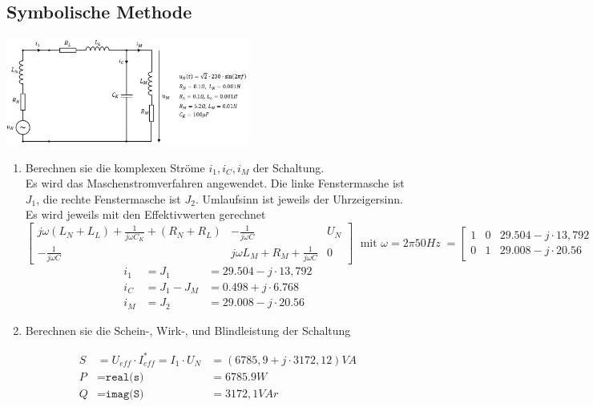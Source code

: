 \newpage
\subsection{Symbolische Methode}
\includegraphics[width=0.6\textwidth]{bilder/a41.png}
\begin{enumerate}
\item Berechnen sie die komplexen Ströme $i_1 , i_C, i_M$ der Schaltung.\\
Es wird das Maschenstromverfahren angewendet. Die linke Fenstermasche ist $J_1$, die rechte Fenstermasche ist $J_2$. Umlaufsinn ist jeweils der Uhrzeigersinn. Es wird jeweils mit den Effektivwerten gerechnet
\[
	\left[
	\begin{array}{lll}
	j\omega (L_N+L_L) + \frac{1}{j\omega C_K}+ (R_N+R_L)&-\frac{1}{j\omega C}&U_N\\
	-\frac{1}{j\omega C} & j\omega L_M + R_M+\frac{1}{j\omega C}&0
\end{array}		
	\right] \;\textrm{ mit }\omega = 2\pi 50Hz \; = \left[
	\begin{array}{lll} 
		1&0&29.504-j\cdot 13,792\\
		0&1&29.008-j\cdot 20.56 	
	\end{array}\right]
\]
\[
	\begin{array}{lll}
		i_1&= J_1 &= 29.504-j\cdot 13,792\\
		i_C&= J_1-J_M &= 0.498+j\cdot 6.768\\
		i_M&=J_2&= 29.008-j\cdot 20.56
	\end{array}
\]
\item Berechnen sie die Schein-, Wirk-, und Blindleistung der Schaltung

\begin{minipage}{0.5\textwidth}
\begin{align*}
	S&=U_{eff}\cdot I_{eff}^* = I_1\cdot U_N &= (6785,9+j\cdot 
3172,12)VA\\
	P&=\texttt{real(s)} &= 6785.9W\\
	Q&=\texttt{imag(S)} &= 3172,1 VAr 
\end{align*}
\end{minipage}


\end{enumerate}
